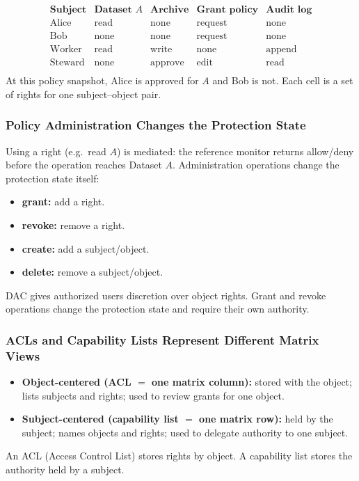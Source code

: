 \documentclass[hidelinks]{article}
\begin{document}
\[
\begin{array}{lllll}
\textbf{Subject} & \textbf{Dataset } A & \textbf{Archive} & \textbf{Grant policy} & \textbf{Audit log}\\ \hline
\text{Alice}   & \text{read} & \text{none}    & \text{request} & \text{none}\\
\text{Bob}     & \text{none} & \text{none}    & \text{request} & \text{none}\\
\text{Worker}  & \text{read} & \text{write}   & \text{none}    & \text{append}\\
\text{Steward} & \text{none} & \text{approve} & \text{edit}    & \text{read}\\
\end{array}
\]
At this policy snapshot, Alice is approved for $A$ and Bob is not. Each cell is a set of rights for one subject--object pair.

\subsubsection{Policy Administration Changes the Protection State}

Using a right (e.g.\ read $A$) is mediated: the reference monitor returns allow/deny before the operation reaches Dataset $A$. Administration operations change the protection state itself:
\begin{itemize}
    \item \textbf{grant:} add a right.
    \item \textbf{revoke:} remove a right.
    \item \textbf{create:} add a subject/object.
    \item \textbf{delete:} remove a subject/object.
\end{itemize}
DAC gives authorized users discretion over object rights. Grant and revoke operations change the protection state and require their own authority.

\subsubsection{ACLs and Capability Lists Represent Different Matrix Views}

\begin{itemize}
    \item \textbf{Object-centered (ACL $=$ one matrix column):} stored with the object; lists subjects and rights; used to review grants for one object.
    \item \textbf{Subject-centered (capability list $=$ one matrix row):} held by the subject; names objects and rights; used to delegate authority to one subject.
\end{itemize}
An ACL (Access Control List) stores rights by object. A capability list stores the authority held by a subject.
\end{document}

